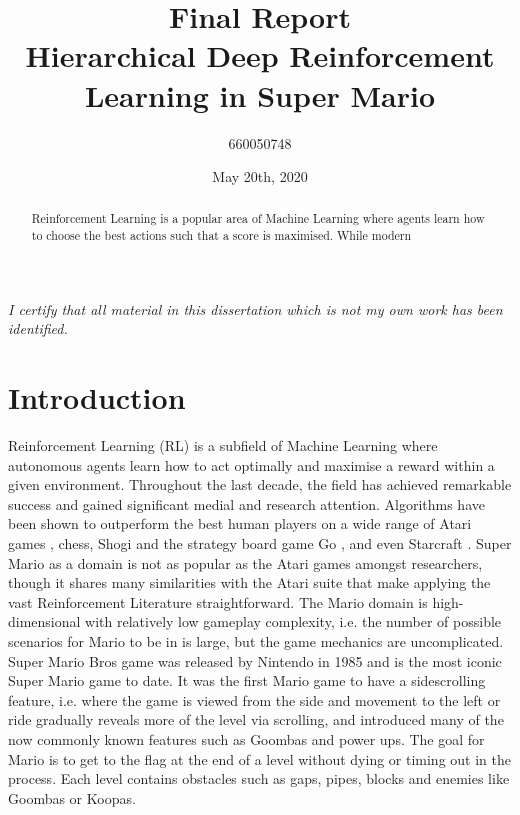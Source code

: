 \documentclass[notitlepage,a4paper,11pt]{article}
\begin{document}
\title{\textbf{Final Report\\
	\large{Hierarchical Deep Reinforcement Learning in Super Mario}}}

\author{660050748}
\date{May 20th, 2020}
\maketitle

\begin{abstract}
Reinforcement Learning is a popular area of Machine Learning where agents learn how to choose the best actions such that a score is maximised. While modern 
\end{abstract}


\vspace*{\fill}
\textit{I certify that all material in this dissertation which is not my own work has been identified.}

\fancyhf{}
\fancyhead[LE]{\leftmark}
\fancyhead[RO]{\rightmark}

\fancyfoot[LE,RO]{\thepage}
\pagebreak


\pagebreak
{}
\section{Introduction}
Reinforcement Learning (RL) is a subfield of Machine Learning where autonomous agents learn how to act optimally and maximise a reward within a given environment. Throughout the last decade, the field has achieved remarkable success and gained significant medial and research attention. Algorithms have been shown to outperform the best human players on a wide range of Atari games \cite{DBLP:journals/corr/MnihKSGAWR13}, chess, Shogi and the strategy board game Go \cite{alpha_go}, and even Starcraft \cite{arulkumaran2019alphastar}. Super Mario as a domain is not as popular as the Atari games amongst researchers, though it shares many similarities with the Atari suite that make applying the vast Reinforcement Literature straightforward. The Mario domain is high-dimensional with relatively low gameplay complexity, i.e. the number of possible scenarios for Mario to be in is large, but the game mechanics are uncomplicated. Super Mario Bros game was released by Nintendo in 1985 and is the most iconic Super Mario game to date. It was the first Mario game to have a sidescrolling feature, i.e. where the game is viewed from the side and movement to the left or ride gradually reveals more of the level via scrolling, and introduced many of the now commonly known features such as Goombas and power ups. The goal for Mario is to get to the flag at the end of a level without dying or timing out in the process. Each level contains obstacles such as gaps, pipes, blocks and enemies like Goombas or Koopas. 
\end{document}
